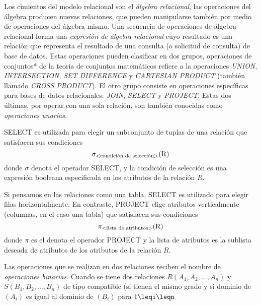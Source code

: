 Los cimientos del modelo relacional son el \emph{álgebra relacional}, las operaciones del álgebra producen nuevas relaciones, que pueden manipularse también por medio de operaciones del álgebra mismo. Una secuencia de operaciones de álgebra relacional forma una \emph{expresión de álgebra relacional} cuyo resultado es una relación que representa el resultado de una consulta (o solicitud de consulta) de base de datos. Estas operaciones pueden clasificar en dos grupos, operaciones de conjuntos* de la teoría de conjuntos matemáticos refiere a la operaciones \emph{UNION}, \emph{INTERSECTION}, \emph{SET DIFFERENCE} y \emph{CARTESIAN PRODUCT} (también llamado \emph{CROSS PRODUCT}). El otro grupo consiste en operaciones específicas para bases de datos relacionales: \emph{JOIN}, \emph{SELECT} y \emph{PROJECT}. Estas dos últimas, por operar con una sola relación, son también conocidas como \emph{operaciones unarias}.

SELECT es utilizada para elegir un subconjunto de tuplas de una relación que satisfacen sus condiciones
\begin{equation}
\sigma_\text{\textless condición de selección\textgreater}{\text{(R)}}
\end{equation}
donde $\sigma$ denota el operador SELECT, y la condición de selección es una expresión booleana especificada en los atributos de la relación $R$.

Si pensamos en las relaciones como una tabla, SELECT es utilizado para elegir filas horizontalmente. En contraste, PROJECT elige atributos verticalmente (columnas, en el caso una tabla) que satisfacen sus condiciones
\begin{equation}
\pi_\text{\textless lista de atributos\textgreater}{\text{(R)}}
\end{equation}
donde $\pi$ es el denota el operador PROJECT y la lista de atributos es la sublista deseada de atributos de los atributos de la relación $R$.

Las operaciones que se realizan en dos relaciones reciben el nombre de \emph{operaciones binarias}. Cuando se tiene dos relaciones $R(A_1,A_2,\ldots,A_n)$ y $S(B_1,B_2,\ldots,B_n)$ de tipo compatible (si tienen el mismo grado y si dominio de $(A_i)$ es igual al dominio de $(B_i)$ para $1\leqi\leqn$